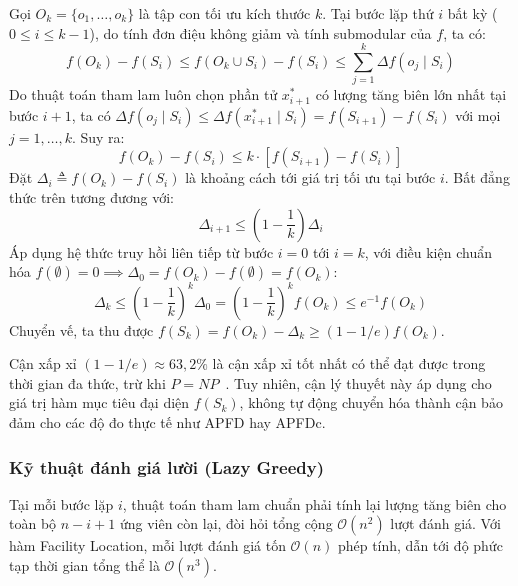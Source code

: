 \begin{cm}
Gọi $O_k = \{o_1, \dots, o_k\}$ là tập con tối ưu kích thước $k$. Tại bước lặp thứ $i$ bất kỳ ($0 \le i \le k - 1$), do tính đơn điệu không giảm và tính submodular của $f$, ta có:
\begin{equation}
f(O_k) - f(S_i) \le f(O_k \cup S_i) - f(S_i) \le \sum_{j=1}^k \Delta f(o_j \mid S_i)
\end{equation}
Do thuật toán tham lam luôn chọn phần tử $x_{i+1}^*$ có lượng tăng biên lớn nhất tại bước $i+1$, ta có $\Delta f(o_j \mid S_i) \le \Delta f(x_{i+1}^* \mid S_i) = f(S_{i+1}) - f(S_i)$ với mọi $j = 1, \dots, k$. Suy ra:
\begin{equation}
f(O_k) - f(S_i) \le k \cdot [f(S_{i+1}) - f(S_i)]
\end{equation}
Đặt $\Delta_i \triangleq f(O_k) - f(S_i)$ là khoảng cách tới giá trị tối ưu tại bước $i$. Bất đẳng thức trên tương đương với:
\begin{equation}
\Delta_{i+1} \le \left(1 - \frac{1}{k}\right) \Delta_i
\end{equation}
Áp dụng hệ thức truy hồi liên tiếp từ bước $i = 0$ tới $i = k$, với điều kiện chuẩn hóa $f(\emptyset) = 0 \implies \Delta_0 = f(O_k) - f(\emptyset) = f(O_k)$:
\begin{equation}
\Delta_k \le \left(1 - \frac{1}{k}\right)^k \Delta_0 = \left(1 - \frac{1}{k}\right)^k f(O_k) \le e^{-1} f(O_k)
\end{equation}
Chuyển vế, ta thu được $f(S_k) = f(O_k) - \Delta_k \ge \left(1 - 1/e\right) f(O_k)$.
\end{cm}

Cận xấp xỉ $(1 - 1/e) \approx 63{,}2\%$ là cận xấp xỉ tốt nhất có thể đạt được trong thời gian đa thức, trừ khi $P = NP$~\cite{nemhauser1978analysis}. Tuy nhiên, cận lý thuyết này áp dụng cho giá trị hàm mục tiêu đại diện $f(S_k)$, không tự động chuyển hóa thành cận bảo đảm cho các độ đo thực tế như APFD hay APFDc.

\subsubsection{Kỹ thuật đánh giá lười (Lazy Greedy)}
\label{subsubsec:lazy_greedy_technique}

Tại mỗi bước lặp $i$, thuật toán tham lam chuẩn phải tính lại lượng tăng biên cho toàn bộ $n - i + 1$ ứng viên còn lại, đòi hỏi tổng cộng $\mathcal{O}(n^2)$ lượt đánh giá. Với hàm Facility Location, mỗi lượt đánh giá tốn $\mathcal{O}(n)$ phép tính, dẫn tới độ phức tạp thời gian tổng thể là $\mathcal{O}(n^3)$.

